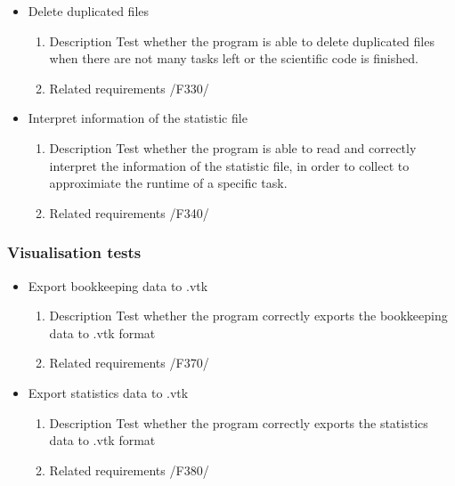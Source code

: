 {\begin{itemize}
				\item Delete duplicated files 
				\begin{enumerate}
					\item Description\newline
Test whether the program is able to delete duplicated files when there are not many tasks left or the scientific code is finished.
					\item Related requirements\newline
					/F330/
				\end{enumerate}
				
				
				
				\item Interpret information of the statistic file
				\begin{enumerate}
					\item Description\newline
Test whether the program is able to read and correctly interpret the information of the statistic file, in order to collect to approximiate the runtime of a specific task.
					\item Related requirements\newline
					/F340/
				\end{enumerate}
				
		\end{itemize}		
		\subsubsection{Visualisation tests}%
		\begin{itemize}
		
				\item Export bookkeeping data to .vtk
				\begin{enumerate}
					\item Description\newline
Test whether the program correctly exports the bookkeeping data to .vtk format
					\item Related requirements\newline
					/F370/
				\end{enumerate}
				
		
				\item Export statistics data to .vtk
				\begin{enumerate}
					\item Description\newline
Test whether the program correctly exports the statistics data to .vtk format
					\item Related requirements\newline
					/F380/
				\end{enumerate}
				

\end{itemize}}
